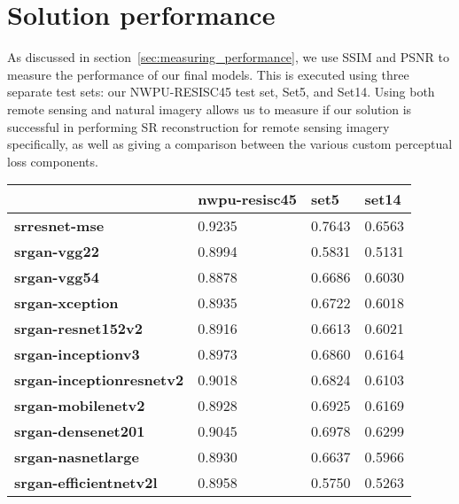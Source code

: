 \section{Solution performance}
As discussed in section~\ref{sec:measuring_performance}, we use SSIM and PSNR to measure the performance of our final models. This is executed using three separate test sets: our NWPU-RESISC45 test set, Set5, and Set14. Using both remote sensing and natural imagery allows us to measure if our solution is successful in performing SR reconstruction for remote sensing imagery specifically, as well as giving a comparison between the various custom perceptual loss components.
\begin{table}[h]
    \centering
    \begin{tabular}{llll}
        \toprule
        {} & \textbf{nwpu-resisc45} & \textbf{set5} & \textbf{set14} \\ 
        \midrule
        \textbf{srresnet-mse} & 0.9235 & 0.7643 & 0.6563 \\ 
        \textbf{srgan-vgg22} & 0.8994 & 0.5831 & 0.5131 \\ 
        \textbf{srgan-vgg54} & 0.8878 & 0.6686 & 0.6030 \\ 
        \textbf{srgan-xception} & 0.8935 & 0.6722 & 0.6018 \\ 
        \textbf{srgan-resnet152v2} & 0.8916 & 0.6613 & 0.6021 \\ 
        \textbf{srgan-inceptionv3} & 0.8973 & 0.6860 & 0.6164 \\ 
        \textbf{srgan-inceptionresnetv2} & 0.9018 & 0.6824 & 0.6103 \\ 
        \textbf{srgan-mobilenetv2} & 0.8928 & 0.6925 & 0.6169 \\ 
        \textbf{srgan-densenet201} & 0.9045 & 0.6978 & 0.6299 \\ 
        \textbf{srgan-nasnetlarge} & 0.8930 & 0.6637 & 0.5966 \\ 
        \textbf{srgan-efficientnetv2l} & 0.8958 & 0.5750 & 0.5263 \\ 
        \bottomrule
    \end{tabular}
\end{table}


